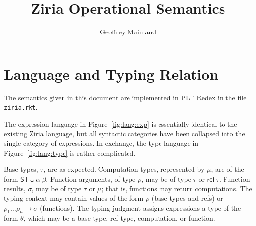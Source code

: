 \documentclass[twocolumn]{article}
\title{Ziria Operational Semantics}
\author{Geoffrey Mainland}
\newcommand{\kw}[1]{\textsf{#1}}
\begin{document}
\maketitle

\section{Language and Typing Relation}

The semantics given in this document are implemented in PLT Redex in the file \texttt{ziria.rkt}.

The expression language in Figure~\ref{fig:lang:exp} is essentially identical to the
existing Ziria language, but all syntactic categories have been collapsed into
the single category of expressions. In exchange, the type language in
Figure~\ref{fig:lang:type} is rather complicated.

Base types, $\tau$, are as expected. Computation types, represented by $\mu$,
are of the form $\kw{ST}~ \omega~ \alpha~ \beta$. Function arguments, of type
$\rho$, may be of type $\tau$ or $\kw{ref}~ \tau$. Function results, $\sigma$,
may be of type $\tau$ or $\mu$; that is, functions may return computations. The
typing context may contain values of the form $\rho$ (base types and \kw{ref}s)
or $\rho_1 \ldots \rho_n \to \sigma$ (functions). The typing judgment assigns
expressions a type of the form $\theta$, which may be a base type, \kw{ref}
type, computation, or function.
\end{document}

